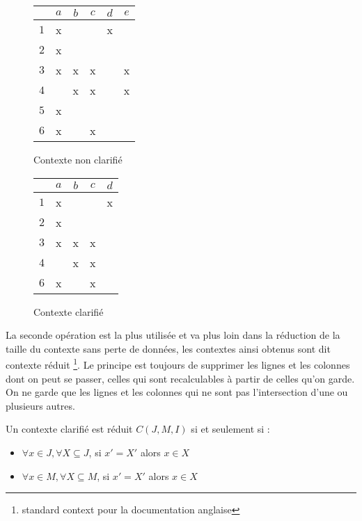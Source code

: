 \begin{figure}[H]
	\begin{minipage}[c]{0.5\textwidth}
	\begin{center}
		\begin{tabular}{ l | c c c c c }
			 & $a$ & $b$ & $c$ & $d$ & $e$ \\
			\hline
			$1$ & x & & & x & \\
			$2$ & x & & & & \\
			$3$ & x & x & x & & x \\
			$4$ & & x & x & & x \\
			$5$ & x & & & & \\
			$6$ & x & & x & & \\
		\end{tabular}
	\end{center}
	\caption{Contexte non clarifié}
	\label{def_contexte_non_clarifie}
	\end{minipage}
	\begin{minipage}[c]{0.5\textwidth}
	\begin{center}
		\begin{tabular}{ l | c c c c }
			 & $a$ & $b$ & $c$ & $d$ \\
			\hline
			$1$ & x & & & x \\
			$2$ & x & & & \\
			$3$ & x & x & x & \\
			$4$ & & x & x & \\
			$6$ & x & & x & \\
		\end{tabular}
	\end{center}
	\caption{Contexte clarifié}
	\label{def_contexte_clarifie}
	\end{minipage}
\end{figure}

La seconde opération est la plus utilisée et va plus loin dans la réduction de la taille du contexte sans perte de données, les contextes ainsi obtenus sont dit \guillemotleft{} contexte réduit \guillemotright \footnote{\guillemotleft{} standard context \guillemotright{} pour la documentation anglaise}. Le principe est toujours de supprimer les lignes et les colonnes dont on peut se passer, celles qui sont recalculables à partir de celles qu'on garde. On ne garde que les lignes et les colonnes qui ne sont pas l'intersection d'une ou plusieurs autres.

\begin{definition}
Un contexte clarifié est réduit $C(J, M, I)$ si et seulement si :
\begin{itemize}
	\item $\forall x \in J, \forall X \subseteq J$, si $x' = X'$ alors $x \in X$
	\item $\forall x \in M, \forall X \subseteq M$, si $x' = X'$ alors $x \in X$
\end{itemize}
\end{definition}

